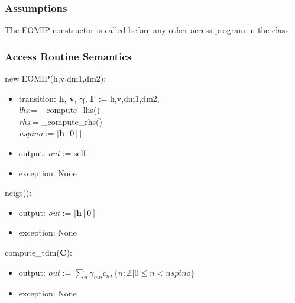 \documentclass[12pt, titlepage]{article}
\begin{document}
\subsubsection{Assumptions}

The EOMIP constructor is called before any other access program in the class.

\subsubsection{Access Routine Semantics}

\noindent new EOMIP(h,v,dm1,dm2):
\begin{itemize}
	\item transition: \textbf{h}, \textbf{v}, $\boldsymbol{\gamma}$, 
	$\boldsymbol{\Gamma}$ := h,v,dm1,dm2,\\ \textit{lhs}:= \_compute\_lhs()\\ 
	\textit{rhs}:= \_compute\_rhs()\\
	\textit{nspino} := $|\boldsymbol{h}[0]|$\\
	\item output: \textit{out} := self 
	\item exception: None
\end{itemize}

\noindent neigs():
\begin{itemize}
	\item output: \textit{out} := $|\boldsymbol{h}[0]|$
	\item exception: None
\end{itemize}

\noindent compute\_tdm(\textbf{C}):
\begin{itemize}
	\item output: \textit{out} := $\sum_{n}\gamma_{mn} c_n, \{n:\mathbb{Z}|0 
	\le n < nspino\}$
	\item exception: None
\end{itemize}

%
\end{document}
